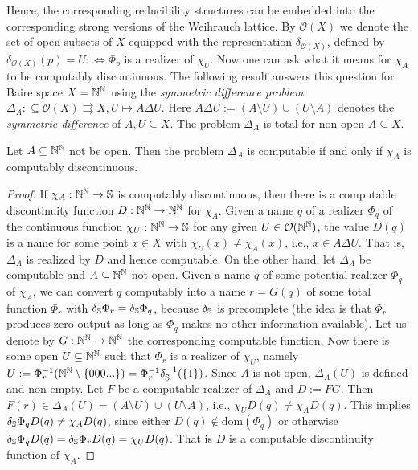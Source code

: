 \documentclass{amsart}
\def\OO{{\mathcal O}}
\def\IN{{\Bbb{N}}}
\def\IS{{\Bbb{S}}}
\def\In{\subseteq}
\def\mto{\rightrightarrows}
\def\dom{{\mathrm{dom}}}
\begin{document}
Hence, the corresponding reducibility structures can be embedded into the corresponding strong versions of the Weih\-rauch lattice.
By $\OO(X)$ we denote the set of open subsets of $X$ equipped with the representation $\delta_{\OO(X)}$,
defined by $\delta_{\OO(X)}(p)=U:\iff\Phi_p$ is a realizer of $\chi_U$.
Now one can ask what it means for $\chi_A$ to be computably discontinuous.
The following result answers this question for Baire space $X=\IN^\IN$ using the {\em symmetric difference problem}
$\Delta_A:\In\OO(X)\mto X,U\mapsto A\Delta U$. Here $A\Delta U:=(A\setminus U)\cup(U\setminus A)$ denotes
the {\em symmetric difference} of $A, U\In X$. The problem $\Delta_A$ is total for non-open $A\In X$.

\begin{proposition}
\label{prop:symmetric-difference}
Let $A\In\IN^\IN$ not be open. Then the problem $\Delta_A$ is computable if and only if $\chi_A$ is computably discontinuous.
\end{proposition}
\begin{proof}
If $\chi_A:\IN^\IN\to\IS$ is computably discontinuous, then there is a computable discontinuity function $D:\IN^\IN\to\IN^\IN$
for $\chi_A$. Given a name $q$ of a realizer $\Phi_q$ of the continuous function $\chi_U:\IN^\IN\to\IS$ for any given $U\in\OO(\IN^\IN)$,
the value $D(q)$ is a name for some point $x\in X$ with $\chi_U(x)\not=\chi_A(x)$, i.e., $x\in A\Delta U$. 
That is, $\Delta_A$ is realized by $D$ and hence computable.
On the other hand, let $\Delta_A$ be computable and $A\In \IN^\IN$ not open.
Given a name $q$ of some potential realizer $\Phi_q$ of $\chi_A$, we can convert $q$ computably into a name $r=G(q)$ of some total function
$\Phi_r$ with $\delta_\IS\Phi_r=\delta_\IS\Phi_q$, because $\delta_\IS$ is precomplete (the idea is that $\Phi_r$ produces zero output as long as $\Phi_q$ makes no other information available).
Let us denote by $G:\IN^\IN\to\IN^\IN$ the corresponding computable function.
Now there is some open $U\In \IN^\IN$ such that $\Phi_r$ is a realizer of $\chi_U$, namely $U:=\Phi_r^{-1}(\IN^\IN\setminus\{000...\})=\Phi_r^{-1}\delta_\IS^{-1}(\{1\})$.
Since $A$ is not open, $\Delta_A(U)$ is defined and non-empty.
Let $F$ be a computable realizer of $\Delta_A$ and $D:=FG$. Then $F(r)\in\Delta_A(U)=(A\setminus U)\cup(U\setminus A)$, 
i.e., $\chi_UD(q)\not=\chi_AD(q)$. This implies $\delta_\IS\Phi_qD(q)\not=\chi_AD(q)$, since either $D(q)\not\in\dom(\Phi_q)$ or otherwise
$\delta_\IS\Phi_qD(q)=\delta_\IS\Phi_rD(q)=\chi_UD(q)$. That is $D$ is a computable discontinuity function of $\chi_A$.
\end{proof}
\end{document}
